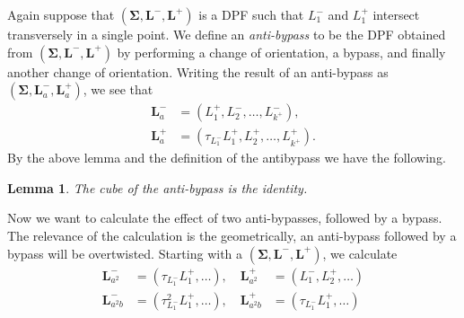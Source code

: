\documentclass[11pt]{amsart}
\newcommand{\thicc}[1]{\pmb{#1}}
\newcommand{\LagTuple}{\thicc{L}}
\newtheorem{lemma}[thm]{Lemma}
\begin{document}
Again suppose that $(\thicc{\Sigma}, \LagTuple^{-}, \LagTuple^{+})$ is a DPF such that $L^{-}_{1}$ and $L^{+}_{1}$ intersect transversely in a single point. We define an \emph{anti-bypass} to be the DPF obtained from $(\thicc{\Sigma}, \LagTuple^{-}, \LagTuple^{+})$ by performing a change of orientation, a bypass, and finally another change of orientation. Writing the result of an anti-bypass as $(\thicc{\Sigma}, \LagTuple^{-}_{a}, \LagTuple^{+}_{a})$, we see that
\begin{equation*}
\begin{aligned}
\LagTuple_{a}^{-} &= (L^{+}_{1}, L^{-}_{2}, \dots, L^{-}_{k^{+}}),\\
\LagTuple_{a}^{+} &= (\tau_{L^{-}_{1}}L^{+}_{1}, L^{+}_{2}, \dots, L^{+}_{k^{+}}).
\end{aligned}
\end{equation*}
By the above lemma and the definition of the antibypass we have the following.

\begin{lemma}
The cube of the anti-bypass is the identity.
\end{lemma}

Now we want to calculate the effect of two anti-bypasses, followed by a bypass. The relevance of the calculation is the geometrically, an anti-bypass followed by a bypass will be overtwisted. Starting with a $(\thicc{\Sigma}, \LagTuple^{-}, \LagTuple^{+})$, we calculate
\begin{equation*}
\begin{aligned}
\LagTuple_{a^{2}}^{-} &= (\tau_{L^{-}_{1}}L^{+}_{1}, \dots),\quad \LagTuple_{a^{2}}^{+} &= (L^{-}_{1}, L^{+}_{2}, \dots)\\
\LagTuple_{a^{2}b}^{-} &= (\tau_{L^{-}_{1}}^{2}L^{+}_{1}, \dots),\quad \LagTuple_{a^{2}b}^{+} &= (\tau_{L^{-}_{1}}L^{+}_{1}, \dots)
\end{aligned}
\end{equation*}
\end{document}
